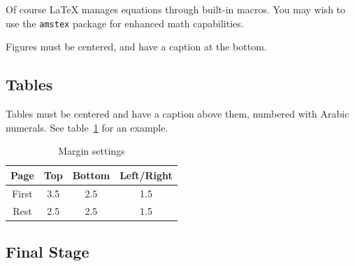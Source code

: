 
Of course LaTeX manages equations through built-in macros. You may
wish to use the \texttt{amstex} package for enhanced math
capabilities.

Figures must be centered, and have a caption at the bottom. 

\subsection{Tables}
Tables must be centered and have a caption above them, numbered with
Arabic numerals. See table~\ref{tb:margins} for an example.

\begin{table}[hb]
\begin{center}
\caption{Margin settings}\label{tb:margins}
\begin{tabular}{cccc}
Page & Top & Bottom & Left/Right \\\hline
First & 3.5 & 2.5 & 1.5 \\
Rest & 2.5 & 2.5 & 1.5 \\ \hline
\end{tabular}
\end{center}
\end{table}

\subsection{Final Stage}


